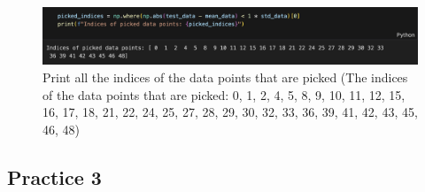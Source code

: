 \documentclass[12pt,a4paper]{article}
\begin{document}
\begin{CJK}{UTF8}{bkai}
\begin{figure}[h]
    \centering
    \includegraphics[width=0.8\linewidth]{figures/code/code_2_7.png}
    \caption{Print all the indices of the data points that are picked (The indices of the data points that are picked: 0, 1, 2, 4, 5, 8, 9, 10, 11, 12, 15, 16, 17, 18, 21, 22, 24, 25, 27, 28, 29, 30, 32, 33, 36, 39, 41, 42, 43, 45, 46, 48)}
    \label{fig:code_2_7}
\end{figure}

\clearpage
\subsection{Practice 3}


\end{CJK}
\end{document}
